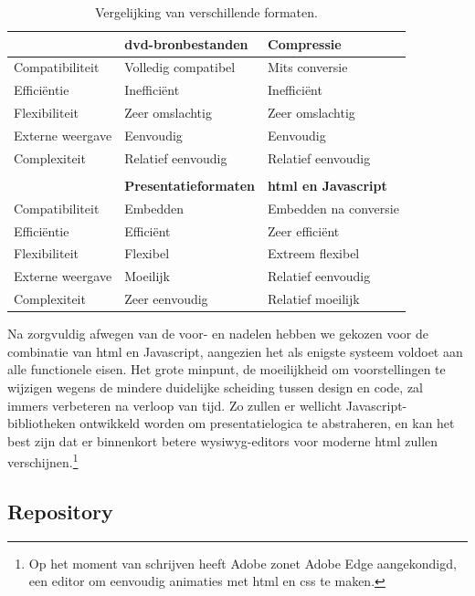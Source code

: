 \begin{table}[h!]
  \begin{center}
    \begin{tabular}{p{3cm} | p{4cm} p{4cm}}
    & \textbf{\acs{dvd}-bronbestanden} & \textbf{Compressie} \\
    \hline
    \hline
    Compatibiliteit & Volledig compatibel & Mits conversie \\
    Efficiëntie & Inefficiënt & Inefficiënt \\
    Flexibiliteit & Zeer omslachtig & Zeer omslachtig \\
    Externe weergave & Eenvoudig & Eenvoudig \\
    Complexiteit & Relatief eenvoudig & Relatief eenvoudig \\
    \\    
    & \textbf{Presentatieformaten} & \textbf{\ac{html} en Javascript} \\
    \hline
    \hline
    Compatibiliteit & Embedden & Embedden na conversie \\
    Efficiëntie & Efficiënt & Zeer efficiënt \\
    Flexibiliteit & Flexibel & Extreem flexibel \\
    Externe weergave & Moeilijk & Relatief eenvoudig \\
    Complexiteit & Zeer eenvoudig & Relatief moeilijk \\
    \end{tabular}
  \end{center}
  \caption{Vergelijking van verschillende formaten.}
\end{table}

Na zorgvuldig afwegen van de voor- en nadelen hebben we gekozen voor de combinatie van \ac{html} en Javascript, aangezien het als enigste systeem voldoet aan alle functionele eisen. Het grote minpunt, de moeilijkheid om voorstellingen te wijzigen wegens de mindere duidelijke scheiding tussen design en code, zal immers verbeteren na verloop van tijd. Zo zullen er wellicht Javascript-bibliotheken ontwikkeld worden om presentatielogica te abstraheren, en kan het best zijn dat er binnenkort betere \ac{wysiwyg}-editors voor moderne \ac{html} zullen verschijnen.\footnote{Op het moment van schrijven heeft Adobe zonet Adobe Edge aangekondigd, een editor om eenvoudig animaties met \ac{html} en \ac{css} te maken.}

\subsection{Repository}

